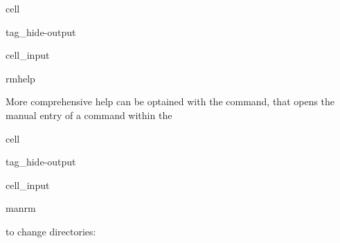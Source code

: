 \documentclass[a4paper,10pt,english]{jupyterBook}
\begin{document}
\begin{sphinxuseclass}{cell}
\begin{sphinxuseclass}{tag_hide-output}\begin{sphinxVerbatimInput}

\begin{sphinxuseclass}{cell_input}
\begin{sphinxVerbatim}[commandchars=\\\{\}]
rm\PYGZhy{}\PYGZhy{}help
\end{sphinxVerbatim}

\end{sphinxuseclass}\end{sphinxVerbatimInput}

\end{sphinxuseclass}
\end{sphinxuseclass}
\sphinxAtStartPar
More comprehensive help can be optained with the  command, that opens the manual entry of a command within the 

\begin{sphinxuseclass}{cell}
\begin{sphinxuseclass}{tag_hide-output}\begin{sphinxVerbatimInput}

\begin{sphinxuseclass}{cell_input}
\begin{sphinxVerbatim}[commandchars=\\\{\}]
manrm
\end{sphinxVerbatim}

\end{sphinxuseclass}\end{sphinxVerbatimInput}

\end{sphinxuseclass}
\end{sphinxuseclass}
\sphinxAtStartPar
{} to change directories:
\end{document}
